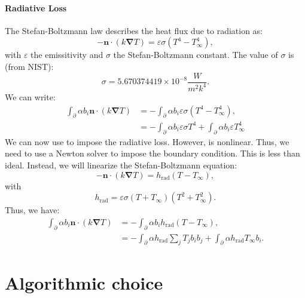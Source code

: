 \documentclass[letterpaper]{article}
\newcommand\bn{\boldsymbol{\nabla}}
\renewcommand{\(}{\left(}
\renewcommand{\)}{\right)}
\renewcommand{\[}{\left[}
\renewcommand{\]}{\right]}
\begin{document}
\paragraph{Radiative Loss}
The Stefan-Boltzmann law describes the heat flux due to radiation as:
\begin{equation}
  -\boldsymbol{n} \cdot  \(k \bn T\) = \varepsilon \sigma \(T^4 -T_{\infty}^4\),
\end{equation}
with $\varepsilon$ the emissitivity and $\sigma$ the Stefan-Boltzmann constant.
The value of $\sigma$ is (from NIST):
\begin{equation}
  \sigma = 5.670374419 \times 10^{-8} \frac{W}{m^2 k^4}.
\end{equation}
We can write:
\begin{equation}
  \begin{split}
    \int_{\partial} \alpha b_i \boldsymbol{n} \cdot \(k\bn T\) &= 
    -\int_{\partial} \alpha b_i \varepsilon \sigma \(T^4 - T_{\infty}^4\),\\
    &= -\int_{\partial} \alpha b_i \varepsilon \sigma T^4 + 
    \int_{\partial} \alpha b_i \varepsilon T_{\infty}^4
  \end{split}
  \label{radiation}
\end{equation}
We can now use  to impose the radiative loss. However,
 is nonlinear. Thus, we need to use a Newton solver to impose
the boundary condition. This is less than ideal. Instead, we will linearize the
Stefan-Boltzmann equation:
\begin{equation}
  -\boldsymbol{n} \cdot \(k\bn T\) = h_{\text{rad}}\(T-T_{\infty}\),
\end{equation}
with
\begin{equation}
  h_{\text{rad}} = \varepsilon \sigma\(T+T_{\infty}\)\(T^2 + T_{\infty}^2\).
\end{equation}
Thus, we have:
\begin{equation}
  \begin{split}
    \int_{\partial} \alpha b_i \boldsymbol{n} \cdot \(k \bn T\) &= 
    -\int_{\partial} \alpha b_i h_{\text{rad}} \(T-T_{\infty}\),\\
    &=-\int_{\partial} \alpha h_{\text{rad}} \sum_j T_j b_i b_j +
    \int_{\partial} \alpha h_{\text{rad}} T_{\infty} b_i.
  \end{split}
\end{equation}


\section{Algorithmic choice}
\end{document}
